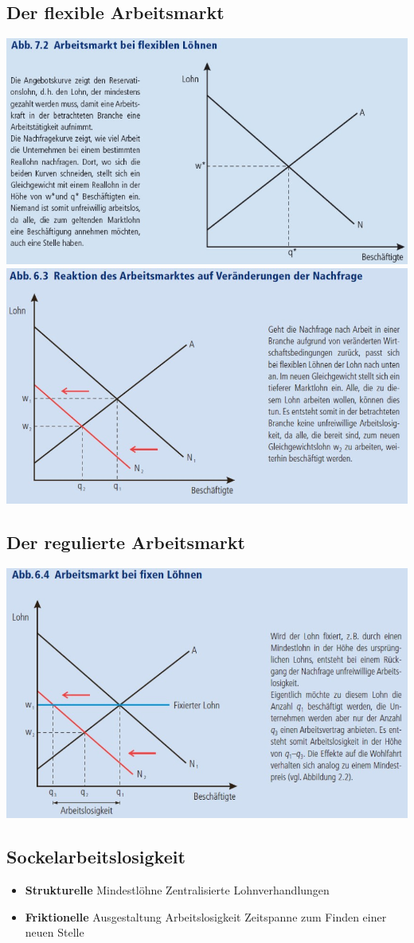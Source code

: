 \subsection{Der flexible Arbeitsmarkt}
\begin{multicols}{2}
	\includegraphics[width=0.5\linewidth]{images/flexibellohne.jpg}
	\includegraphics[width=0.5\linewidth]{images/flexibellohne2.jpg}
\end{multicols}
\subsection{Der regulierte Arbeitsmarkt}
	\includegraphics[width=0.8\linewidth]{images/fixelohne.jpg}
\subsection{Sockelarbeitslosigkeit}
\begin{itemize}
	\item \textbf{Strukturelle}
	\subitem Mindestlöhne
	\subitem Zentralisierte Lohnverhandlungen
	\item \textbf{Friktionelle}
	\subitem Ausgestaltung Arbeitslosigkeit
	\subitem Zeitspanne zum Finden einer neuen Stelle
\end{itemize}
